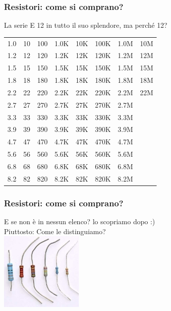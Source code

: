		\begin{frame}[c]\frametitle{Resistori: come si comprano?}

		\centering La serie E 12 in tutto il suo splendore, ma perché 12?
		    
		\begin{tabular}{c|c|c|c|c|c|c|c}
			1.0 & 10 & 100 & 1.0K & 10K & 100K & 1.0M & 10M \\
			1.2 & 12 & 120 & 1.2K & 12K & 120K & 1.2M & 12M \\ 
			1.5 & 15 & 150 & 1.5K & 15K & 150K & 1.5M & 15M  \\
			1.8 & 18 & 180 & 1.8K & 18K & 180K & 1.8M & 18M  \\
			2.2 & 22 & 220 & 2.2K & 22K & 220K & 2.2M & 22M  \\
			2.7 & 27 & 270 & 2.7K & 27K & 270K & 2.7M & \\
			3.3 & 33 & 330 & 3.3K & 33K & 330K & 3.3M & \\
			3.9 & 39 & 390 & 3.9K & 39K & 390K & 3.9M & \\
			4.7 & 47 & 470 & 4.7K & 47K & 470K & 4.7M & \\
			5.6 & 56 & 560 & 5.6K & 56K & 560K & 5.6M & \\
			6.8 & 68 & 680 & 6.8K & 68K & 680K & 6.8M & \\
			8.2 & 82 & 820 & 8.2K & 82K & 820K & 8.2M & \\
		\end{tabular}
		
		\end{frame}

		\begin{frame}[c]\frametitle{Resistori: come si comprano?}
		    \centering
		E se non è in nessun elenco? lo scopriamo dopo :)\\
		Piuttosto: Come le distinguiamo?\\
		\includegraphics[width=4cm]{./img/resistenze.jpg}
		
		\end{frame}

